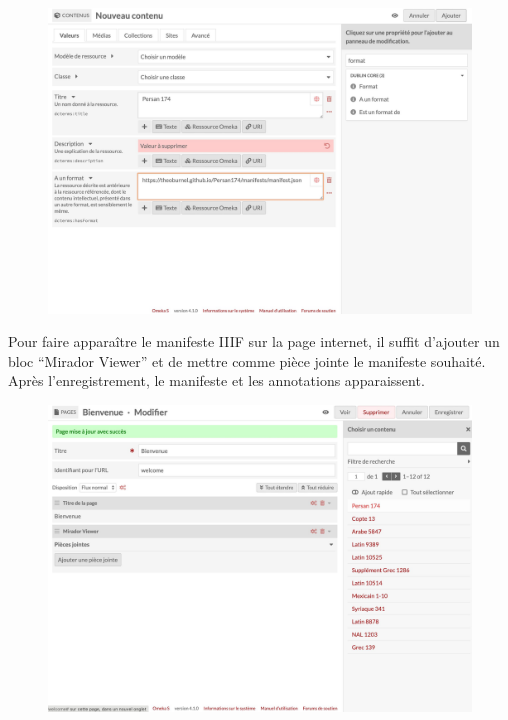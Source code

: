 \begin{figure}[H]
	\centering
	\includegraphics[scale=0.15]{./textes/annexe/omeka-item.jpg}
	\label{fig:info}
\end{figure}

Pour faire apparaître le manifeste IIIF sur la page internet, il suffit d’ajouter un bloc \enquote{Mirador Viewer} et de mettre comme pièce jointe le manifeste souhaité. Après l’enregistrement, le manifeste et les annotations apparaissent.\par

\begin{figure}[H]
	\centering
	\includegraphics[scale=0.15]{./textes/annexe/omeka-visu.jpg}
	\label{fig:info}
\end{figure}

